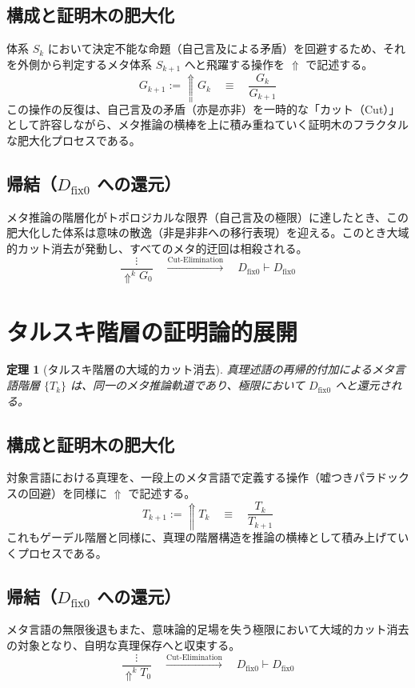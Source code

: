 \documentclass[12pt,a4paper]{article}
\newcommand{\dfix}{D_{\mathrm{fix}0}} %
\newcommand{\metanegation}{\Uparrow} %
\newtheorem{theorem}{定理}[section]
\begin{document}
\subsection*{構成と証明木の肥大化}
体系 $S_k$ において決定不能な命題（自己言及による矛盾）を回避するため、それを外側から判定するメタ体系 $S_{k+1}$ へと飛躍する操作を $\metanegation$ で記述する。
\[
  G_{k+1} := \metanegation G_k \quad \equiv \quad \frac{G_k}{G_{k+1}}
\]
この操作の反復は、自己言及の矛盾（亦是亦非）を一時的な「カット（Cut）」として許容しながら、メタ推論の横棒を上に積み重ねていく証明木のフラクタルな肥大化プロセスである。

\subsection*{帰結（$\dfix$ への還元）}
メタ推論の階層化がトポロジカルな限界（自己言及の極限）に達したとき、この肥大化した体系は意味の散逸（非是非非への移行表現）を迎える。このとき大域的カット消去が発動し、すべてのメタ的迂回は相殺される。
\[
  \frac{\vdots}{\metanegation^k G_0} \quad \xrightarrow{\text{Cut-Elimination}} \quad \dfix \vdash \dfix
\]

\section{タルスキ階層の証明論的展開}
\begin{theorem}[タルスキ階層の大域的カット消去]
真理述語の再帰的付加によるメタ言語階層 $\{T_k\}$ は、同一のメタ推論軌道であり、極限において $\dfix$ へと還元される。
\end{theorem}

\subsection*{構成と証明木の肥大化}
対象言語における真理を、一段上のメタ言語で定義する操作（嘘つきパラドックスの回避）を同様に $\metanegation$ で記述する。
\[
  T_{k+1} := \metanegation T_k \quad \equiv \quad \frac{T_k}{T_{k+1}}
\]
これもゲーデル階層と同様に、真理の階層構造を推論の横棒として積み上げていくプロセスである。

\subsection*{帰結（$\dfix$ への還元）}
メタ言語の無限後退もまた、意味論的足場を失う極限において大域的カット消去の対象となり、自明な真理保存へと収束する。
\[
  \frac{\vdots}{\metanegation^k T_0} \quad \xrightarrow{\text{Cut-Elimination}} \quad \dfix \vdash \dfix
\]
\end{document}
